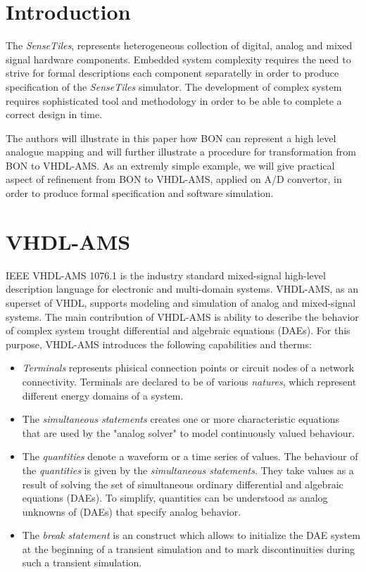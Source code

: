 \documentclass{article}
\newcommand{\STs}{\emph{SenseTiles}\xspace}
\begin{document}
\section{Introduction}
The \STs, represents heterogeneous collection of digital, analog 
and mixed signal hardware components. Embedded system complexity 
requires the need to strive for formal descriptions each component 
separatelly in order to produce specification of the \STs simulator. 
The development of complex system requires sophisticated tool and methodology 
in order to be able to complete a correct design in time.  

The authors will illustrate in this paper how BON can represent a high 
level analogue mapping and will further illustrate a procedure for 
transformation from BON to VHDL-AMS. As an extremly simple example, 
we will give practical aspect of refinement from BON to VHDL-AMS,
applied on A/D convertor, in order to produce formal specification 
and software simulation.


\section{VHDL-AMS}
IEEE VHDL-AMS 1076.1 is the industry standard mixed-signal 
high-level description language for electronic and multi-domain 
systems. VHDL-AMS, as an superset of VHDL, supports modeling and 
simulation of analog and mixed-signal systems. The main contribution 
of VHDL-AMS is ability to describe the behavior of complex system 
trought differential and algebraic equations (DAEs). For this purpose, 
VHDL-AMS introduces the following capabilities and therms:

\begin{itemize}
\item 
\emph{Terminals} represents phisical connection points or circuit nodes 
of a network connectivity. Terminals are declared to be of various 
\emph{natures}, which represent different energy domains of a system.
\item
The \emph{simultaneous statements} creates one or more characteristic 
equations that are used by the "analog solver" to model continuously 
valued behaviour.  
\item
The \emph{quantities} denote a waveform or a time series of values.
The behaviour of the \emph{quantities} is given by the \emph{simultaneous
 statements}. They take values as a result of solving the set of simultaneous 
ordinary differential and algebraic equations (DAEs). To simplify, 
quantities can be understood as analog unknowns of (DAEs) that specify 
analog behavior. 
\item
The \emph{break statement} is an construct which allows to 
initialize the DAE system at the beginning of a transient 
simulation and to mark discontinuities during such a transient 
simulation.

\end{itemize} 
 
\end{document}
